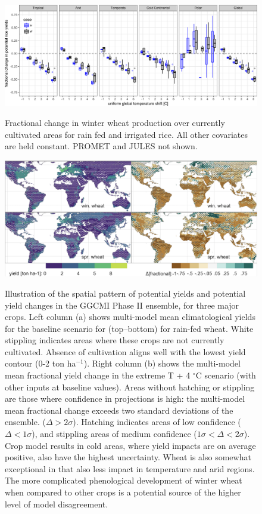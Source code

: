 \documentclass[10pt]{article}
\begin{document}
{\begin{figure}[h!]
\includegraphics[width=\textwidth]{s_rice_sim_CG_area_weight.png}\\
\caption{Fractional change in winter wheat production over currently cultivated areas for rain fed and irrigated rice. All other covariates are held constant. PROMET and JULES not shown.}
\label{fig:winter_wheat_currentcult}
\end{figure}

\begin{figure}[h!]
\includegraphics[width=\textwidth]{s_wheat_baseline.png}\\
\caption{Illustration of the spatial pattern of potential yields and potential yield changes in the GGCMI Phase II ensemble, for three major crops. Left column (a) shows multi-model mean climatological yields for the baseline scenario for (top--bottom) for rain-fed wheat. White stippling indicates areas where these crops are not currently cultivated. Absence of cultivation aligns well with the lowest yield contour (0-2 ton ha$^{-1}$). Right column (b) shows the multi-model mean fractional yield change in the extreme T + 4 $^{\circ}$C scenario (with other inputs at baseline values). Areas without hatching or stippling are those where confidence in projections is high: the multi-model mean fractional change exceeds two standard deviations of the ensemble. ($\Delta > 2\sigma$). Hatching indicates areas of low confidence ($\Delta < 1 \sigma$), and stippling areas of medium confidence ($1 \sigma < \Delta < 2 \sigma$). Crop model results in cold areas, where yield impacts are on average positive, also have the highest uncertainty. Wheat is also somewhat exceptional in that  also less impact in temperature and arid regions. The more complicated phenological development of winter wheat when compared to other crops is a potential source of the higher level of model disagreement.}
\label{fig:wheatbaseline}
\end{figure}

}
\end{document}
